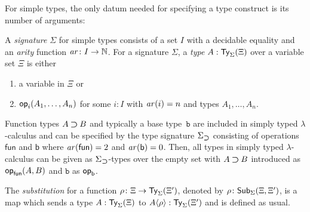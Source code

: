 For simple types, the only datum needed for specifying a type construct is its number of arguments:
\begin{defn} \label{def:simple-signature}
  A \emph{signature} $\Sigma$ for simple types consists of a set $I$ with a decidable equality and an \emph{arity} function $\mathit{ar}\colon I \to \mathbb{N}$.
  For a signature $\Sigma$, a \emph{type} $A : \mathsf{Ty}_{\Sigma}(\Xi)$ over a variable set $\Xi$ is either
  \begin{enumerate}
    \item a variable in $\Xi$ or
    \item $\mathsf{op}_{i}(A_1, \ldots, A_n)$ for some $i:I$ with $\mathit{ar}(i) = n$ and types $A_1,\ldots, A_n$.
  \end{enumerate}
\end{defn}

\begin{example} \label{ex:type-signature-for-function-type}
  Function types $A \mathbin{\bm{\supset}} B$ and typically a base type~$\mathtt{b}$ are included in simply typed $\lambda$-calculus and can be specified by the type signature $\Sigma_{\mathbin{\bm{\supset}}}$ consisting of operations $\mathsf{fun}$ and $\mathsf{b}$ where $\mathit{ar}(\mathsf{fun}) = 2$ and $\mathit{ar}(\mathsf{b}) = 0$.
  Then, all types in simply typed $\lambda$-calculus can be given as $\Sigma_{\mathbin{\bm{\supset}}}$-types over the empty set with $A \mathbin{\bm{\supset}} B$ introduced as $\mathsf{op}_{\mathsf{fun}}(A, B)$ and $\mathtt{b}$ as $\mathsf{op}_{\mathsf{b}}$. 
\end{example}

\begin{defn}\label{def:substitution}
The \emph{substitution} for a function $\rho\colon \Xi \to \mathsf{Ty}_{\Sigma}(\Xi')$, denoted by $\rho\colon \mathsf{Sub}_{\Sigma}(\Xi,\Xi')$, is a map which sends a type $A : \mathsf{Ty}_{\Sigma}(\Xi)$ to ${A}\!\left<{\rho}\right> : \mathsf{Ty}_{\Sigma}(\Xi')$ and is defined as usual.
\end{defn}

